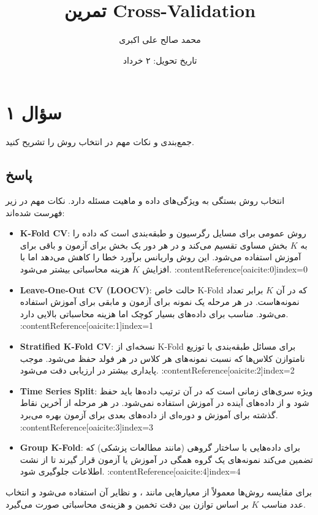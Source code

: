 \documentclass[12pt]{article}
\title{تمرین Cross-Validation}
\author{محمد صالح علی اکبری}
\date{تاریخ تحویل: ۲ خرداد}
\begin{document}
	
	\maketitle
	
	\section*{سؤال ۱}
	جمع‌بندی و نکات مهم در انتخاب روش  را تشریح کنید.
	
	\subsection*{پاسخ}
	انتخاب روش  بستگی به ویژگی‌های داده و ماهیت مسئله دارد. نکات مهم در زیر فهرست شده‌اند: 
	\begin{itemize}
		\item \textbf{K-Fold CV}: روش عمومی برای مسایل رگرسیون و طبقه‌بندی است که داده را به \(K\) بخش مساوی تقسیم می‌کند و در هر دور یک بخش برای آزمون و باقی برای آموزش استفاده می‌شود. این روش واریانس برآورد خطا را کاهش می‌دهد اما با افزایش \(K\) هزینه محاسباتی بیشتر می‌شود. :contentReference[oaicite:0]{index=0}
		\item \textbf{Leave-One-Out CV (LOOCV)}: حالت خاص K-Fold که در آن \(K\) برابر تعداد نمونه‌هاست. در هر مرحله یک نمونه برای آزمون و مابقی برای آموزش استفاده می‌شود. مناسب برای داده‌های بسیار کوچک اما هزینه محاسباتی بالایی دارد. :contentReference[oaicite:1]{index=1}
		\item \textbf{Stratified K-Fold CV}: نسخه‌ای از K-Fold برای مسائل طبقه‌بندی با توزیع نامتوازن کلاس‌ها که نسبت نمونه‌های هر کلاس در هر فولد حفظ می‌شود. موجب پایداری بیشتر در ارزیابی دقت می‌شود. :contentReference[oaicite:2]{index=2}
		\item \textbf{Time Series Split}: ویژه سری‌های زمانی است که در آن ترتیب داده‌ها باید حفظ شود و از داده‌های آینده در آموزش استفاده نمی‌شود. در هر مرحله از آخرین نقاط گذشته برای آموزش و دوره‌ای از داده‌های بعدی برای آزمون بهره می‌برد. :contentReference[oaicite:3]{index=3}
		\item \textbf{Group K-Fold}: برای داده‌هایی با ساختار گروهی (مانند مطالعات پزشکی) که تضمین می‌کند نمونه‌های یک گروه همگی در آموزش یا آزمون قرار گیرند تا از نشت اطلاعات جلوگیری شود. :contentReference[oaicite:4]{index=4}
	\end{itemize}
	برای مقایسه روش‌ها معمولاً از معیارهایی مانند ،  و نظایر آن استفاده می‌شود و انتخاب عدد مناسب \(K\) بر اساس توازن بین دقت تخمین و هزینه‌ی محاسباتی صورت می‌گیرد. 
	
\end{document}
